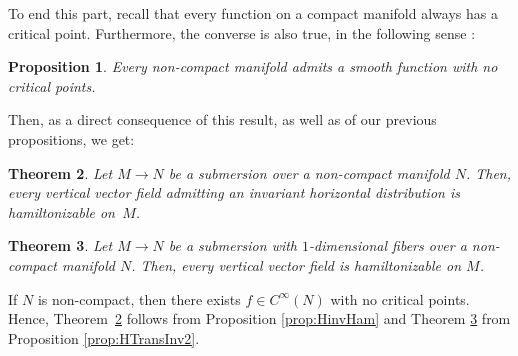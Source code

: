 \documentclass[10pt,a4paper]{amsart}
\numberwithin{equation}{section}
\newtheorem{Theorem}{Theorem}[section]
\newtheorem{Proposition}[Theorem]{Proposition}
 { \theoremstyle{definition}
\newtheorem{Definition}[Theorem]{Definition}
\newtheorem{Note}[Theorem]{Note}
\newtheorem{Example}[Theorem]{Example}
\newtheorem{Remark}[Theorem]{Remark} }
\begin{document}
To end this part, recall that every function on a compact manifold always has a critical point. Furthermore, the converse is also true, in the following sense \cite[Theorem 4.8]{Hirsch-61}:

\begin{Proposition}\label{prop:NonCompReg}
Every non-compact manifold admits a smooth function with no critical points.
\end{Proposition}

Then, as a direct consequence of this result, as well as of our previous propositions, we get:

\begin{Theorem}\label{teo:HorInv}
Let $M \to N$ be a submersion over a non-compact manifold $N$. Then, every vertical vector field admitting an invariant horizontal distribution is hamiltonizable on~$M$.
\end{Theorem}

\begin{Theorem}\label{teo:VertHam}
Let $M{\to}N$ be a submersion with $1$-dimensional fibers over a non-compact manifold $N$. Then, every vertical vector field is hamiltonizable on $M$.
\end{Theorem}

If $N$ is non-compact, then there exists $f\in C^{\infty}(N)$ with no critical points. Hence, Theo\-rem~\ref{teo:HorInv} follows from Proposition \ref{prop:HinvHam} and Theorem \ref{teo:VertHam} from Proposition \ref{prop:HTransInv2}.
\end{document}
